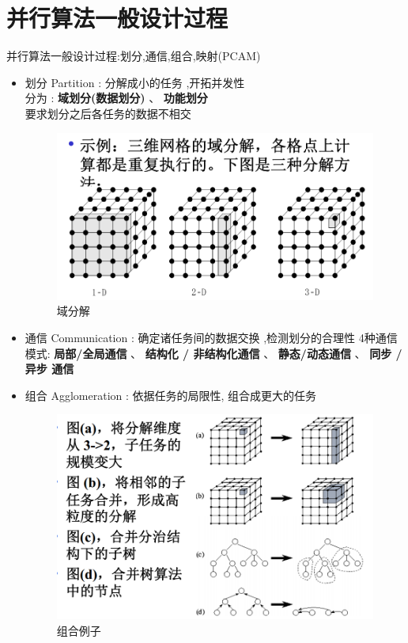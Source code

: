 \documentclass[UTF8,a4paper]{ctexart}
\begin{document}
  \section{并行算法一般设计过程}
  并行算法一般设计过程:划分,通信,组合,映射(PCAM)
  \begin{itemize}
    \item 划分 Partition : 分解成小的任务 ,开拓并发性\\
    分为 : \textbf{域划分(数据划分)} 、 \textbf{功能划分}\\
    要求划分之后各任务的数据不相交
    \begin{figure}[H]
      \centering
      \includegraphics[scale = 0.3]{assets/ParallelComputing_64f1a.png}
      \caption{域分解}
    \end{figure}
    \item 通信 Communication : 确定诸任务间的数据交换 ,检测划分的合理性
    4种通信模式: \textbf{局部/全局通信} 、 \textbf{结构化 / 非结构化通信}
    、 \textbf{静态/动态通信} 、 \textbf{同步 /异步 通信}

    \item 组合 Agglomeration : 依据任务的局限性, 组合成更大的任务
    \begin{figure}[H]
      \centering
      \includegraphics[scale = 0.3]{assets/ParallelComputing_e3e03.png}
      \caption{组合例子}
    \end{figure}


\end{itemize}
\end{document}
